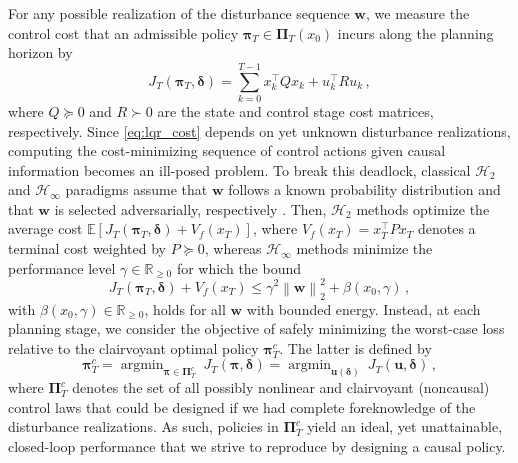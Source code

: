 \documentclass[conference]{IEEEtran}
\newcommand{\norm}[1]{\left\lVert#1\right\rVert}
\begin{document}
For any possible realization of the disturbance sequence $\mathbf{w}$, we measure the control cost that an admissible policy $\bm{\pi}_T \in \bm{\Pi}_T(x_0)$ incurs along the planning horizon by
\begin{equation}
    \label{eq:lqr_cost}
    J_T(\bm{\pi}_T, \bm{\delta}) = \sum_{k = 0}^{T-1} x_{k}^\top Q x_{k} + u_k^\top R u_k\,,%
\end{equation}
where $Q \succeq 0$ and $R \succ 0$ are the state and control stage cost matrices, respectively.  Since \eqref{eq:lqr_cost} depends on yet unknown disturbance realizations, computing the cost-minimizing sequence of control actions given causal information becomes an ill-posed problem. To break this deadlock, classical $\mathcal{H}_2$ and $\mathcal{H}_\infty$ paradigms assume that $\mathbf{w}$ follows a known probability distribution and that $\mathbf{w}$ is selected adversarially, respectively \cite{hassibi1999indefinite}. Then, $\mathcal{H}_2$ methods optimize the average cost $\mathbb{E}[J_T(\bm{\pi}_T, \bm{\delta}) + V_f(x_T)]$, where $V_f(x_T) = x_T^\top P x_T$ denotes a terminal cost weighted by $P \succeq 0$, whereas $\mathcal{H}_\infty$ methods minimize the performance level $\gamma \in \mathbb{R}_{\geq 0}$ for which the bound
\begin{equation}
    \label{eq:h_infinity_bound}
    J_T(\bm{\pi}_T, \bm{\delta}) + V_f(x_T) \leq \gamma^2 \norm{\mathbf{w}}_2^2 + \beta(x_0, \gamma)\,,
\end{equation}
with $\beta(x_0, \gamma) \in \mathbb{R}_{\geq 0}$, holds for all $\mathbf{w}$ with bounded energy. Instead, at each planning stage, we consider the objective of safely minimizing the worst-case loss relative to the clairvoyant optimal policy $\bm{\pi}^c_T$. The latter is defined by
\begin{equation}
    \label{eq:clairvoyant_argmin_definition}
    \bm{\pi}^c_T = \operatorname{argmin}_{\bm{\pi} \in \bm{\Pi}_{T}^c} ~ J_T(\bm{\pi}, \bm{\delta}) = \operatorname{argmin}_{\mathbf{u}(\bm{\delta})} ~ J_T(\mathbf{u}, \bm{\delta})\,,
\end{equation}
where $\bm{\Pi}_{T}^c$ denotes the set of all possibly nonlinear and clairvoyant (noncausal) control laws that could be designed if we had complete foreknowledge of the disturbance realizations. As such, policies in $\bm{\Pi}_{T}^c$ yield an ideal, yet unattainable, closed-loop performance that we strive to reproduce by designing a causal policy.
\end{document}

